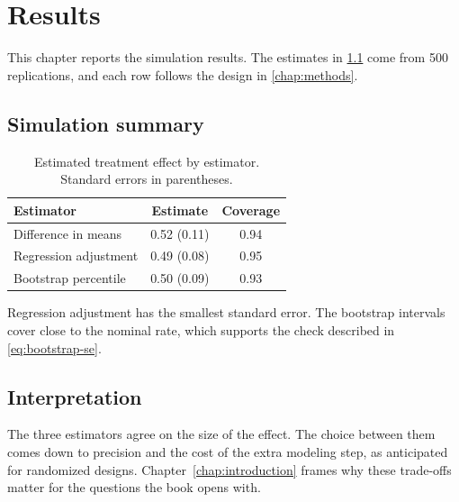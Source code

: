 \chapter{Results}\label{chap:results}

This chapter reports the simulation results. The estimates in \cref{tab:book-results} come from 500 replications, and each row follows the design in \cref{chap:methods}.

\section{Simulation summary}\label{sec:simulation}

\begin{table}[ht]
  \centering
  \caption{Estimated treatment effect by estimator. Standard errors in parentheses.}\label{tab:book-results}
  \begin{tabular}{lcc}
    \toprule
    Estimator & Estimate & Coverage \\
    \midrule
    Difference in means & 0.52 (0.11) & 0.94 \\
    Regression adjustment & 0.49 (0.08) & 0.95 \\
    Bootstrap percentile & 0.50 (0.09) & 0.93 \\
    \bottomrule
  \end{tabular}
\end{table}

Regression adjustment has the smallest standard error. The bootstrap intervals cover close to the nominal rate, which supports the check described in \cref{eq:bootstrap-se}.

\section{Interpretation}\label{sec:interpretation}

The three estimators agree on the size of the effect. The choice between them comes down to precision and the cost of the extra modeling step, as \citet{rubin1974} anticipated for randomized designs. Chapter~\ref{chap:introduction} frames why these trade-offs matter for the questions the book opens with.
